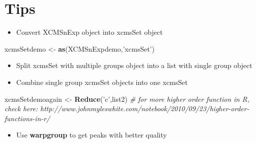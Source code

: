 \documentclass[
]{book}
\newenvironment{Shaded}{\begin{snugshade}}{\end{snugshade}}
\newcommand{\CommentTok}[1]{\textcolor[rgb]{0.56,0.35,0.01}{\textit{#1}}}
\newcommand{\KeywordTok}[1]{\textcolor[rgb]{0.13,0.29,0.53}{\textbf{#1}}}
\newcommand{\NormalTok}[1]{#1}
\newcommand{\OperatorTok}[1]{\textcolor[rgb]{0.81,0.36,0.00}{\textbf{#1}}}
\newcommand{\StringTok}[1]{\textcolor[rgb]{0.31,0.60,0.02}{#1}}
\providecommand{\tightlist}{%
  \setlength{\itemsep}{0pt}\setlength{\parskip}{0pt}}
\begin{document}
\hypertarget{tips}{%
\section{Tips}\label{tips}}

\begin{itemize}
\tightlist
\item
  Convert XCMSnExp object into xcmsSet object
\end{itemize}

\begin{Shaded}
\begin{Highlighting}[]
\NormalTok{xcmsSetdemo <-}\StringTok{ }\KeywordTok{as}\NormalTok{(XCMSnExpdemo,}\StringTok{'xcmsSet'}\NormalTok{)}
\end{Highlighting}
\end{Shaded}

\begin{itemize}
\tightlist
\item
  Split xcmsSet with multiple groups object into a list with single group object
\end{itemize}

\begin{Shaded}
\end{Shaded}

\begin{itemize}
\tightlist
\item
  Combine single group xcmsSet objects into one xcmsSet
\end{itemize}

\begin{Shaded}
\begin{Highlighting}[]
\NormalTok{xcmsSetdemoagain <-}\StringTok{ }\KeywordTok{Reduce}\NormalTok{(}\StringTok{'c'}\NormalTok{,list2)}
\CommentTok{# for more higher order function in R, check here: http://www.johnmyleswhite.com/notebook/2010/09/23/higher-order-functions-in-r/}
\end{Highlighting}
\end{Shaded}

\begin{itemize}
\tightlist
\item
  Use \textbf{warpgroup} to get peaks with better quality
\end{itemize}
\end{document}
